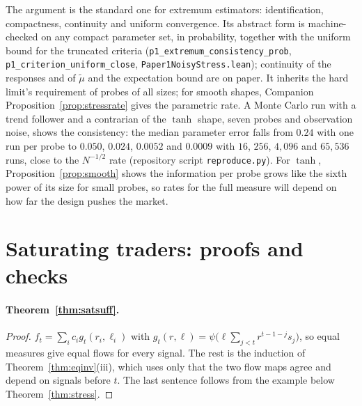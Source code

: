\documentclass[12pt]{article}
\theoremstyle{definition}
\theoremstyle{remark}
\begin{document}
The argument is the standard one for extremum estimators: identification, compactness, continuity and uniform convergence. Its abstract form is machine-checked on any compact parameter set, in probability, together with the uniform bound for the truncated criteria (\texttt{p1\_extremum\_consistency\_prob}, \texttt{p1\_criterion\_uniform\_close}, \nolinkurl{Paper1NoisyStress.lean}); continuity of the responses and of $\tilde\mu$ and the expectation bound are on paper. It inherits the hard limit's requirement of probes of all sizes; for smooth shapes, Companion Proposition~\ref{prop:stressrate} gives the parametric rate. A Monte Carlo run with a trend follower and a contrarian of the $\tanh$ shape, seven probes and observation noise, shows the consistency: the median parameter error falls from $0.24$ with one run per probe to $0.050$, $0.024$, $0.0052$ and $0.0009$ with $16$, $256$, $4{,}096$ and $65{,}536$ runs, close to the $N^{-1/2}$ rate (repository script \nolinkurl{reproduce.py}). For $\tanh$, Proposition~\ref{prop:smooth} shows the information per probe grows like the sixth power of its size for small probes, so rates for the full measure will depend on how far the design pushes the market.

\section{Saturating traders: proofs and checks}\label{app:saturating}

\paragraph{Theorem~\ref{thm:satsuff}.}
\begin{proof}
$f_t=\sum_ic_ig_t(r_i,\ell_i)$ with $g_t(r,\ell)=\psi\bigl(\ell\sum_{j<t}r^{t-1-j}s_j\bigr)$, so equal measures give equal flows for every signal. The rest is the induction of Theorem~\ref{thm:eqinv}(iii), which uses only that the two flow maps agree and depend on signals before $t$. The last sentence follows from the example below Theorem~\ref{thm:stress}.
\end{proof}
\end{document}
